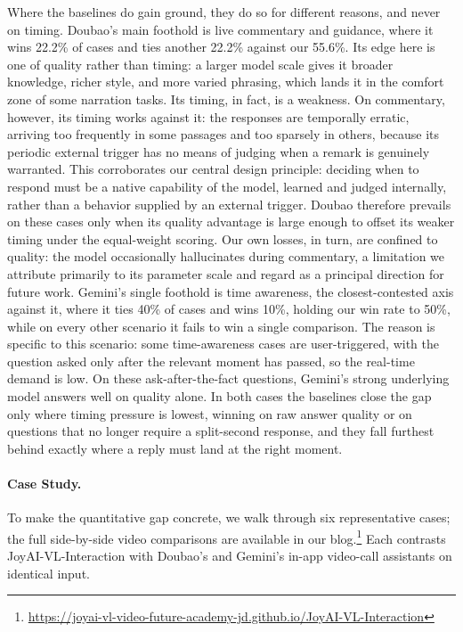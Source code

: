 Where the baselines do gain ground, they do so for different reasons, and never on timing. Doubao's main foothold is live commentary and guidance, where it wins 22.2\% of cases and ties another 22.2\% against our 55.6\%. Its edge here is one of quality rather than timing: a larger model scale gives it broader knowledge, richer style, and more varied phrasing, which lands it in the comfort zone of some narration tasks. Its timing, in fact, is a weakness. On commentary, however, its timing works against it: the responses are temporally erratic, arriving too frequently in some passages and too sparsely in others, because its periodic external trigger has no means of judging when a remark is genuinely warranted. This corroborates our central design principle: deciding when to respond must be a native capability of the model, learned and judged internally, rather than a behavior supplied by an external trigger. Doubao therefore prevails on these cases only when its quality advantage is large enough to offset its weaker timing under the equal-weight scoring. Our own losses, in turn, are confined to quality: the model occasionally hallucinates during commentary, a limitation we attribute primarily to its parameter scale and regard as a principal direction for future work.
Gemini's single foothold is time awareness, the closest-contested axis against it, where it ties 40\% of cases and wins 10\%, holding our win rate to 50\%, while on every other scenario it fails to win a single comparison. The reason is specific to this scenario: some time-awareness cases are user-triggered, with the question asked only after the relevant moment has passed, so the real-time demand is low. On these ask-after-the-fact questions, Gemini's strong underlying model answers well on quality alone.
In both cases the baselines close the gap only where timing pressure is lowest, winning on raw answer quality or on questions that no longer require a split-second response, and they fall furthest behind exactly where a reply must land at the right moment.



\paragraph{\textbf{Case Study.}}
To make the quantitative gap concrete, we walk through six representative cases; the full side-by-side video comparisons are available in our blog.\footnote{\url{https://joyai-vl-video-future-academy-jd.github.io/JoyAI-VL-Interaction}} Each contrasts JoyAI-VL-Interaction with Doubao's and Gemini's in-app video-call assistants on identical input.

